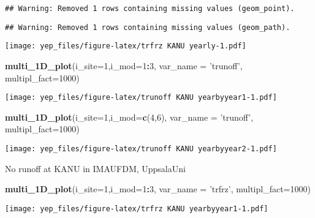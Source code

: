 \documentclass[]{article}
\newenvironment{Shaded}{\begin{snugshade}}{\end{snugshade}}
\newcommand{\DataTypeTok}[1]{\textcolor[rgb]{0.13,0.29,0.53}{#1}}
\newcommand{\DecValTok}[1]{\textcolor[rgb]{0.00,0.00,0.81}{#1}}
\newcommand{\KeywordTok}[1]{\textcolor[rgb]{0.13,0.29,0.53}{\textbf{#1}}}
\newcommand{\NormalTok}[1]{#1}
\newcommand{\OperatorTok}[1]{\textcolor[rgb]{0.81,0.36,0.00}{\textbf{#1}}}
\newcommand{\StringTok}[1]{\textcolor[rgb]{0.31,0.60,0.02}{#1}}
\begin{document}
\begin{verbatim}
## Warning: Removed 1 rows containing missing values (geom_point).
\end{verbatim}

\begin{verbatim}
## Warning: Removed 1 rows containing missing values (geom_path).
\end{verbatim}

\texttt{[image: yep\_files/figure-latex/trfrz KANU yearly-1.pdf]}

\begin{Shaded}
\begin{Highlighting}[]
\KeywordTok{multi_1D_plot}\NormalTok{(}\DataTypeTok{i_site=}\DecValTok{1}\NormalTok{,}\DataTypeTok{i_mod=}\DecValTok{1}\OperatorTok{:}\DecValTok{3}\NormalTok{, }\DataTypeTok{var_name =} \StringTok{'trunoff'}\NormalTok{,  }\DataTypeTok{multipl_fact=}\DecValTok{1000}\NormalTok{)  }
\end{Highlighting}
\end{Shaded}

\texttt{[image: yep\_files/figure-latex/trunoff KANU yearbyyear1-1.pdf]}

\begin{Shaded}
\begin{Highlighting}[]
\KeywordTok{multi_1D_plot}\NormalTok{(}\DataTypeTok{i_site=}\DecValTok{1}\NormalTok{,}\DataTypeTok{i_mod=}\KeywordTok{c}\NormalTok{(}\DecValTok{4}\NormalTok{,}\DecValTok{6}\NormalTok{), }\DataTypeTok{var_name =} \StringTok{'trunoff'}\NormalTok{,  }\DataTypeTok{multipl_fact=}\DecValTok{1000}\NormalTok{)  }
\end{Highlighting}
\end{Shaded}

\texttt{[image: yep\_files/figure-latex/trunoff KANU yearbyyear2-1.pdf]}

No runoff at KANU in IMAUFDM, UppsalaUni

\begin{Shaded}
\begin{Highlighting}[]
\KeywordTok{multi_1D_plot}\NormalTok{(}\DataTypeTok{i_site=}\DecValTok{1}\NormalTok{,}\DataTypeTok{i_mod=}\DecValTok{1}\OperatorTok{:}\DecValTok{3}\NormalTok{, }\DataTypeTok{var_name =} \StringTok{'trfrz'}\NormalTok{,  }\DataTypeTok{multipl_fact=}\DecValTok{1000}\NormalTok{)  }
\end{Highlighting}
\end{Shaded}

\texttt{[image: yep\_files/figure-latex/trfrz KANU yearbyyear1-1.pdf]}
\end{document}
